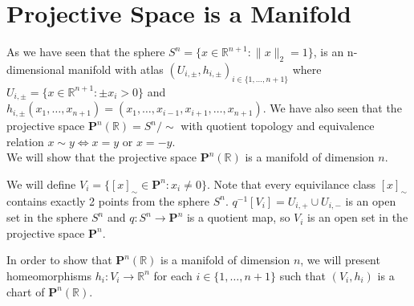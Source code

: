 \documentclass[11pt]{book} %
\begin{document}

\section{Projective Space is a Manifold}

As we have seen that the sphere \( S^n = \{ x \in \mathbb{R}^{n+1} : \| x \|_2 = 1 \} \), 
is an n-dimensional manifold with atlas \( (U_{i, \pm}, h_{i, \pm})_{i \in \{1, \dots ,n+1\}} \) 
where \( U_{i, \pm} = \{ x \in \mathbb{R}^{n+1} : \pm x_i > 0 \} \) and \( h_{i, \pm}(x_1, \ldots, x_{n+1}) = (x_1, \ldots, x_{i-1}, x_{i+1}, \ldots, x_{n+1}) \).
We have also seen that the projective space \( \mathbf{P}^n (\mathbb{R}) = S^n / \sim \) with quotient topology and equivalence 
relation \( x \sim y \Leftrightarrow x = y \) or \( x = -y \). \\
We will show that the projective space \( \mathbf{P}^n (\mathbb{R}) \) is a manifold of dimension \( n \).

\medbreak

We will define \( V_i = \{ [x]_\sim \in \mathbf{P}^n : x_i \neq 0 \} \). 
Note that every equivilance class \( [x]_\sim \) contains exactly 2 points from the sphere \( S^n \).
\( q^{-1}[V_i] = U_{i, +} \cup U_{i, -} \) is an open set in the sphere \( S^n \) and \( q: S^n \to \mathbf{P}^n \) is a quotient map,
so \( V_i \) is an open set in the projective space \( \mathbf{P}^n \).

\medbreak

In order to show that \( \mathbf{P}^n (\mathbb{R}) \) is a manifold of dimension \( n \), 
we will present homeomorphisms \( h_i: V_i \to \mathbb{R}^n \) for each \( i \in \{1, \ldots, n+1\} \) such that \( (V_i, h_i) \) is a chart of \( \mathbf{P}^n (\mathbb{R}) \).
\end{document}
